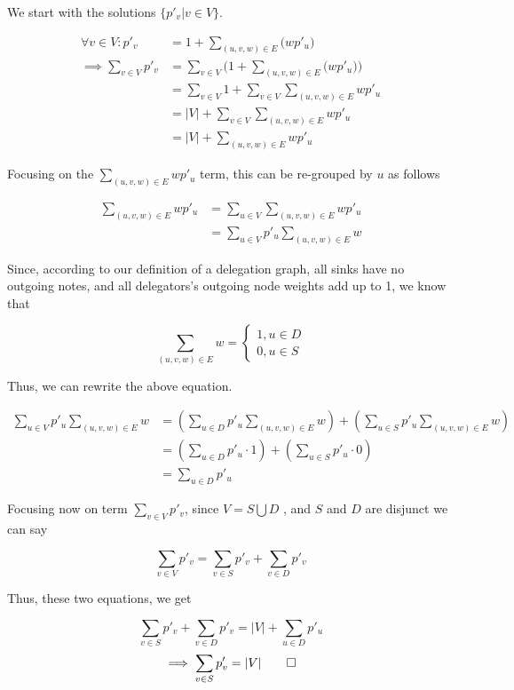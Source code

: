 We start with the solutions $\{p'_v | v \in V\}$.

\begin{align*}
\forall v \in V: p'_v &= 1+\sum_{(u, v, w) \in E} \bigl(wp'_u \bigr) \\
\implies \sum_{v \in V} p'_v &= \sum_{v \in V} \bigl( 1 + \sum_{(u, v, w) \in E} \bigl( wp'_u \bigr ) \bigr) \\
&= \sum_{v \in V} 1 + \sum_{v \in V} \sum_{(u, v, w) \in E} wp'_u \\
&= |V| + \sum_{v \in V} \sum_{(u, v, w) \in E} wp'_u \\
&= |V| + \sum_{(u, v, w) \in E} wp'_u
\end{align*}

Focusing on the $\sum_{(u, v, w) \in E} wp'_u$ term, this can be re-grouped by $u$ as follows 

\begin{align*}
\sum_{(u, v, w) \in E} wp'_u &= \sum_{u \in V} \sum_{(u, v, w) \in E} wp'_u \\
&= \sum_{u \in V} p'_u  \sum_{(u, v, w) \in E} w
\end{align*}

Since, according to our definition of a delegation graph, all sinks have no outgoing notes, and all delegators's outgoing node weights add up to 1, we know that

\[
\sum_{(u, v, w) \in E} w = \begin{cases} 1, u \in D \\ 0, u \in S \end{cases}
\]

Thus, we can rewrite the above equation.

\begin{align*}
\sum_{u \in V} p'_u  \sum_{(u, v, w) \in E} w &= \left(\sum_{u \in D} p'_u  \sum_{(u, v, w) \in E} w \right) + \left( \sum_{u \in S} p'_u  \sum_{(u, v, w) \in E} w \right) \\
&= \left( \sum_{u \in D} p'_u \cdot 1 \right) + \left(\sum_{u \in S} p'_u \cdot 0 \right) \\
&= \sum_{u \in D} p'_u
\end{align*}

Focusing now on term $\sum_{v \in V} p'_v$, since $V = S \bigcup D$ , and $S$ and $D$ are disjunct we can say

\[
\sum_{v \in V} p'_v = \sum_{v \in S} p'_v  + \sum_{v \in D} p'_v 
\]

Thus, these two equations, we get

\[
\sum_{v \in S} p'_v  + \sum_{v \in D} p'_v  = |V| + \sum_{u \in D} p'_u
\]
\[
\implies \sum_{v \in S} p'_v   = |V| \qed
\]


\\
